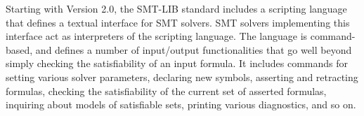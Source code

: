Starting with Version 2.0, the SMT-LIB standard includes a scripting language that 
defines a textual interface for SMT solvers.
SMT solvers implementing this interface act as interpreters
of the scripting language.
The language is command-based,
and defines a number of input/output functionalities
that go well beyond simply checking the satisfiability of an input formula.
It includes commands for 
setting various solver parameters,
declaring new symbols, 
asserting and retracting formulas, 
checking the satisfiability of the current set of asserted formulas, 
inquiring about models of satisfiable sets,
printing various diagnostics, and so on.


